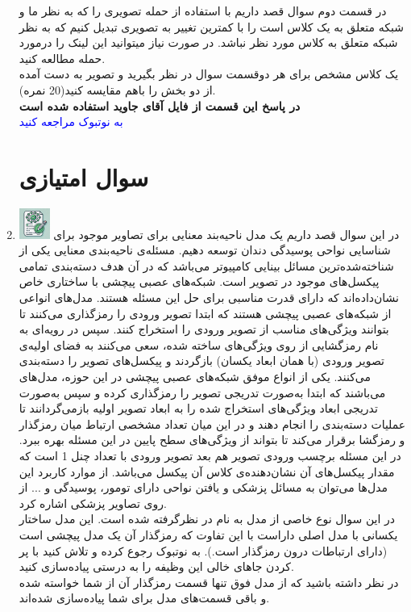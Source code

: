 \documentclass[12pt]{article}
\begin{document}
\begin{enumerate}
    در قسمت دوم سوال قصد داریم با استفاده از حمله  تصویری را که به نظر ما و شبکه متعلق به یک کلاس است را با کمترین تغییر به تصویری تبدیل کنیم که به نظر شبکه متعلق به کلاس مورد نظر نباشد. در صورت نیاز میتوانید این لینک را درمورد حمله \href{https://medium.com/@zachariaharungeorge/a-deep-dive-into-the-fast-gradient-sign-method-611826e34865}{} مطالعه کنید.\\
    یک کلاس مشخص برای هر دوقسمت سوال در نظر بگیرید و تصویر به دست آمده از دو بخش را باهم مقایسه کنید(20 نمره).\\
    \textbf{در پاسخ این قسمت از فایل آقای جاوید استفاده شده است}\\
    \textcolor{blue}{
    به نوتبوک  مراجعه کنید
    }

    \section*{سوال امتیازی} 
    \item \includegraphics[width=1cm]{figs/Allowed_with_contributino.jpg}
    در این سوال قصد داریم یک مدل ناحیه‌بند معنایی  برای تصاویر  موجود برای شناسایی نواحی پوسیدگی دندان توسعه دهیم. مسئله‌ی ناحیه‌بندی معنایی یکی از شناخته‌شده‌ترین مسائل بینایی کامپیوتر می‌باشد که در آن هدف دسته‌بندی تمامی پیکسل‌های موجود در تصویر است. شبکه‌های عصبی پیچشی با ساختاری خاص نشان‌داده‌اند که دارای قدرت مناسبی برای حل این مسئله هستند. مدل‌های  انواعی از شبکه‌های عصبی پیچشی هستند که ابتدا تصویر ورودی را رمزگذاری  می‌کنند تا بتوانند ویژگی‌های مناسب از تصویر ورودی را استخراج کنند. سپس در رویه‌ای به نام رمزگشایی  از روی ویژگی‌های ساخته شده، سعی می‌کنند به فضای اولیه‌ی تصویر ورودی (با همان ابعاد یکسان) بازگردند و پیکسل‌های تصویر را دسته‌بندی می‌کنند. یکی از انواع موفق شبکه‌های عصبی پیچشی در این حوزه، مدل‌های \href{https://arxiv.org/pdf/1505.04597}{} می‌باشند که ابتدا به‌صورت تدریجی تصویر را رمزگذاری کرده و سپس به‌صورت تدریجی ابعاد ویژگی‌های استخراج شده را به ابعاد تصویر اولیه بازمی‌گردانند تا عملیات دسته‌بندی را انجام دهند و در این میان تعداد مشخصی ارتباط میان رمزگذار و رمزگشا برقرار می‌کند تا بتواند از ویژگی‌های سطح پایین در این مسئله بهره ببرد. در این مسئله برچسب ورودی تصویر هم بعد تصویر ورودی با تعداد چنل 1 است که مقدار پیکسل‌های آن نشان‌دهنده‌ی کلاس آن پیکسل می‌باشد. از موارد کاربرد این مدل‌ها می‌توان به مسائل پزشکی و یافتن نواحی دارای تومور، پوسیدگی و ... از روی تصاویر پزشکی اشاره کرد.\\
    در این سوال نوع خاصی از مدل  به نام  در نظرگرفته شده است. این مدل ساختار یکسانی با مدل  اصلی داراست با این تفاوت که رمزگذار آن یک مدل پیچشی  است (دارای ارتباطات  درون رمزگذار است.). به نوتبوک  رجوع کرده و تلاش کنید با پر کردن جاهای خالی این وظیفه را به درستی پیاده‌سازی کنید.\\
    در نظر داشته باشید که از مدل فوق تنها قسمت رمزگذار آن از شما خواسته شده و باقی قسمت‌های مدل برای شما پیاده‌سازی شده‌اند.\\


\end{enumerate}
\end{document}
